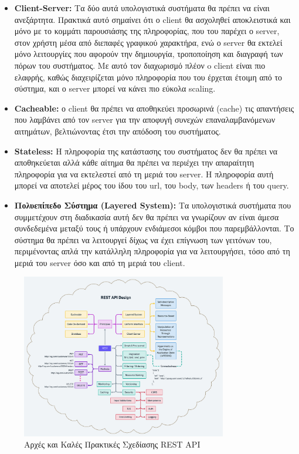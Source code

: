 \begin{itemize}
	\item \textbf{Client-Server:} Τα δύο αυτά υπολογιστικά συστήματα θα πρέπει να είναι ανεξάρτητα.
		Πρακτικά αυτό σημαίνει ότι ο client θα ασχοληθεί αποκλειστικά και μόνο με το κομμάτι παρουσιάσης της πληροφορίας, που του παρέχει ο server,
		στον χρήστη μέσα από διεπαφές γραφικού χαρακτήρα, ενώ ο server θα εκτελεί μόνο λειτουργίες που αφορούν την δημιουργία, τροποποίηση και διαγραφή των πόρων του
		συστήματος. Με αυτό τον διαχωρισμό πλέον o client είναι πιο ελαφρής, καθώς διαχειρίζεται μόνο πληροφορία που του έρχεται έτοιμη από το σύστημα,
		και ο server μπορεί να κάνει πιο εύκολα scaling.
	\item \textbf{Cacheable:} ο client θα πρέπει να αποθηκεύει προσωρινά (cache) τις
		απαντήσεις που λαμβάνει από τον server για την αποφυγή συνεχών επαναλαμβανόμενων αιτημάτων, βελτιώνοντας
		έτσι την απόδοση του συστήματος.
	\item \textbf{Stateless:} Η πληροφορία της κατάστασης του συστήματος δεν θα πρέπει να αποθηκεύεται
		αλλά κάθε αίτημα θα πρέπει να περιέχει την απαραίτητη πληροφορία για να εκτελεστεί από τη μεριά του server.
		Η πληροφορία αυτή μπορεί να αποτελεί μέρος του ίδου του url, του body, των headers ή του query.
	\item \textbf{Πολυεπίπεδο Σύστημα (Layered System):} Τα υπολογιστικά συστήματα που συμμετέχουν στη διαδικασία αυτή δεν
		θα πρέπει να γνωρίζουν αν είναι άμεσα συνδεδεμένα μεταξύ τους ή υπάρχουν ενδιάμεσοι κόμβοι που παρεμβάλλονται.
		Το σύστημα θα πρέπει να λειτουργεί δίχως να έχει επίγνωση των γειτόνων του, περιμένοντας απλά την κατάλληλη πληροφορία για να
		λειτουργήσει, τόσο από τη μεριά του server όσο και από τη μεριά του client.
\end{itemize}

\begin{figure}[!ht]
	\centering
	\includegraphics[width=0.8\textwidth]{./images/chapter2/rest_principles.png}
	\caption[Αρχές και Καλές Πρακτικές Σχεδίασης REST API]{Αρχές και Καλές Πρακτικές Σχεδίασης REST API}
	\label{fig:rest_principles}
\end{figure}